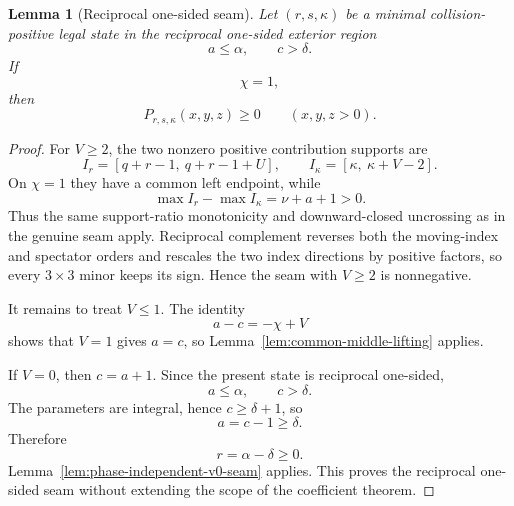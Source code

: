 \documentclass[11pt]{article}
\newtheorem{lemma}[theorem]{Lemma}
\theoremstyle{definition}
\begin{document}
\begin{lemma}[Reciprocal one-sided seam]
\label{lem:reciprocal-one-sided-seam}
Let \((r,s,\kappa)\) be a minimal collision-positive legal state in the reciprocal one-sided exterior region
\begin{equation*}
a\le\alpha,
\qquad
c>\delta.
\end{equation*}
If
\begin{equation*}
\chi=1,
\end{equation*}
then
\begin{equation*}
P_{r,s,\kappa}(x,y,z)\ge0
\qquad(x,y,z>0).
\end{equation*}
\end{lemma}

\begin{proof}
For \(V\ge2\), the two nonzero positive contribution supports are
\begin{equation*}
I_r=[q+r-1,\ q+r-1+U],
\qquad
I_\kappa=[\kappa,\ \kappa+V-2].
\end{equation*}
On \(\chi=1\) they have a common left endpoint, while
\begin{equation*}
\max I_r-\max I_\kappa
=\nu+a+1>0.
\end{equation*}
Thus the same support-ratio monotonicity and downward-closed uncrossing as in the genuine seam apply.  Reciprocal complement reverses both the moving-index and spectator orders and rescales the two index directions by positive factors, so every \(3\times3\) minor keeps its sign.  Hence the seam with \(V\ge2\) is nonnegative.

It remains to treat \(V\le1\).  The identity
\begin{equation*}
a-c=-\chi+V
\end{equation*}
shows that \(V=1\) gives \(a=c\), so Lemma~\ref{lem:common-middle-lifting} applies.

If \(V=0\), then \(c=a+1\).  Since the present state is reciprocal one-sided,
\begin{equation*}
a\le\alpha,
\qquad
c>\delta.
\end{equation*}
The parameters are integral, hence \(c\ge\delta+1\), so
\begin{equation*}
a=c-1\ge\delta.
\end{equation*}
Therefore
\begin{equation*}
r=\alpha-\delta\ge0.
\end{equation*}
Lemma~\ref{lem:phase-independent-v0-seam} applies.  This proves the reciprocal one-sided seam without extending the scope of the coefficient theorem.
\end{proof}
\end{document}
